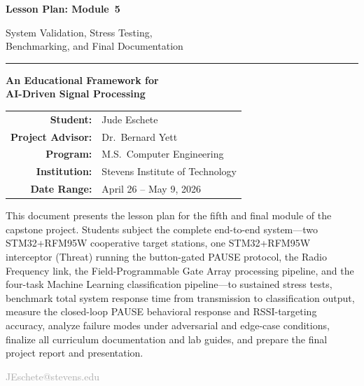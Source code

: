 \documentclass[11pt,letterpaper]{article}
\begin{document}
	\begin{titlepage}
		\centering
		\vspace*{2cm}

		{\Huge\bfseries\color{stevens} Lesson Plan: Module~5\par}
		\vspace{0.5cm}
		{\LARGE\color{darkgray} System Validation, Stress Testing,\\[4pt]
			Benchmarking, and Final Documentation\par}

		\vspace{1.5cm}
		\rule{0.6\textwidth}{1pt}
		\vspace{1.5cm}

		{\Large\textbf{An Educational Framework for\\[4pt]
				AI-Driven Signal Processing}\par}

		\vspace{1.5cm}

		\begin{tabular}{rl}
			\textbf{Student:}         & Jude Eschete \\
			\textbf{Project Advisor:} & Dr.\ Bernard Yett \\
			\textbf{Program:}         & M.S.\ Computer Engineering \\
			\textbf{Institution:}     & Stevens Institute of Technology \\
			\textbf{Date Range:}      & April 26 -- May 9, 2026 \\
		\end{tabular}

		\vspace{2cm}

		\begin{tcolorbox}[colback=lightgray, colframe=darkgray, width=0.85\textwidth, arc=2pt]
			\centering\small
			This document presents the lesson plan for the fifth and final module of the capstone
			project. Students subject the complete end-to-end system---two STM32+RFM95W cooperative target stations,
			one STM32+RFM95W interceptor (Threat) running the button-gated PAUSE protocol, the Radio Frequency link,
			the Field-Programmable Gate Array processing pipeline, and the four-task Machine Learning classification
			pipeline---to sustained stress tests, benchmark total system response time from transmission to
			classification output, measure the closed-loop PAUSE behavioral response and RSSI-targeting accuracy,
			analyze failure modes under adversarial and edge-case conditions, finalize all curriculum documentation
			and lab guides, and prepare the final project report and presentation.
		\end{tcolorbox}

		\vfill
		{\small\textcolor{darkgray}{JEschete@stevens.edu}}
	\end{titlepage}
\end{document}

